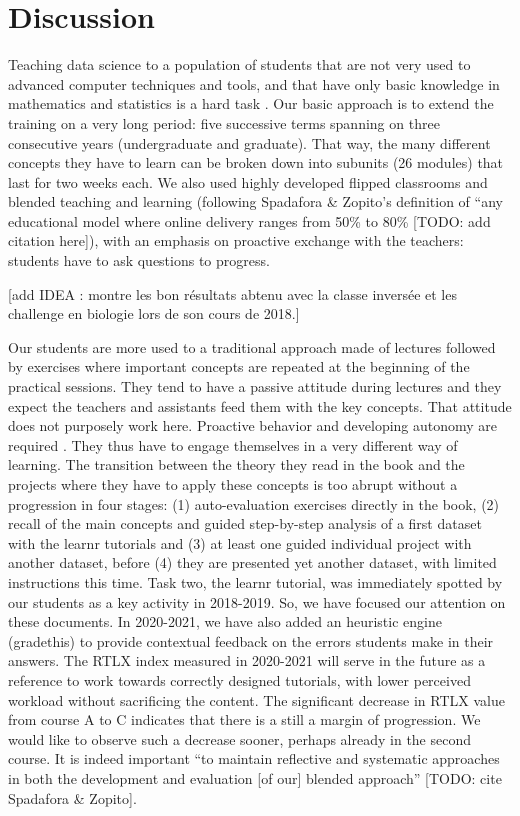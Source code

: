 \documentclass{aims}
\theoremstyle{definition}
\begin{document}
\hypertarget{discussion}{%
\section{Discussion}\label{discussion}}

Teaching data science to a population of students that are not very used
to advanced computer techniques and tools, and that have only basic
knowledge in mathematics and statistics is a hard task \cite{Sousa2018}.
Our basic approach is to extend the training on a very long period: five
successive terms spanning on three consecutive years (undergraduate and
graduate). That way, the many different concepts they have to learn can
be broken down into subunits (26 modules) that last for two weeks each.
We also used highly developed flipped classrooms and blended teaching
and learning (following Spadafora \& Zopito's definition of ``any
educational model where online delivery ranges from 50\% to 80\%
{[}TODO: add citation here{]}), with an emphasis on proactive exchange
with the teachers: students have to ask questions to progress.

{[}add IDEA : \cite{Compeau2019} montre les bon résultats abtenu avec la
classe inversée et les challenge en biologie lors de son cours de
2018.{]}

Our students are more used to a traditional approach made of lectures
followed by exercises where important concepts are repeated at the
beginning of the practical sessions. They tend to have a passive
attitude during lectures and they expect the teachers and assistants
feed them with the key concepts. That attitude does not purposely work
here. Proactive behavior and developing autonomy are required
\cite{Freeman2014}. They thus have to engage themselves in a very
different way of learning. The transition between the theory they read
in the book and the projects where they have to apply these concepts is
too abrupt without a progression in four stages: (1) auto-evaluation
exercises directly in the book, (2) recall of the main concepts and
guided step-by-step analysis of a first dataset with the learnr
tutorials and (3) at least one guided individual project with another
dataset, before (4) they are presented yet another dataset, with limited
instructions this time. Task two, the learnr tutorial, was immediately
spotted by our students as a key activity in 2018-2019. So, we have
focused our attention on these documents. In 2020-2021, we have also
added an heuristic engine (gradethis) to provide contextual feedback on
the errors students make in their answers. The RTLX index measured in
2020-2021 will serve in the future as a reference to work towards
correctly designed tutorials, with lower perceived workload without
sacrificing the content. The significant decrease in RTLX value from
course A to C indicates that there is a still a margin of progression.
We would like to observe such a decrease sooner, perhaps already in the
second course. It is indeed important ``to maintain reflective and
systematic approaches in both the development and evaluation {[}of
our{]} blended approach'' {[}TODO: cite Spadafora \& Zopito{]}.
\end{document}
